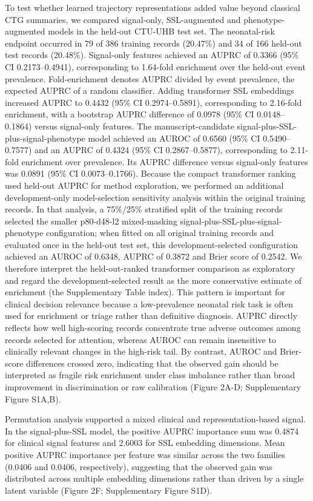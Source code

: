 \documentclass[11pt]{article}
\begin{document}
To test whether learned trajectory representations added value beyond classical CTG summaries, we compared signal-only, SSL-augmented and phenotype-augmented models in the held-out CTU-UHB test set. The neonatal-risk endpoint occurred in 79 of 386 training records (20.47\%) and 34 of 166 held-out test records (20.48\%). Signal-only features achieved an AUPRC of 0.3366 (95\% CI 0.2173--0.4941), corresponding to 1.64-fold enrichment over the held-out event prevalence. Fold-enrichment denotes AUPRC divided by event prevalence, the expected AUPRC of a random classifier. Adding transformer SSL embeddings increased AUPRC to 0.4432 (95\% CI 0.2974--0.5891), corresponding to 2.16-fold enrichment, with a bootstrap AUPRC difference of 0.0978 (95\% CI 0.0148--0.1864) versus signal-only features. The manuscript-candidate signal-plus-SSL-plus-signal-phenotype model achieved an AUROC of 0.6560 (95\% CI 0.5490--0.7577) and an AUPRC of 0.4324 (95\% CI 0.2867--0.5877), corresponding to 2.11-fold enrichment over prevalence. Its AUPRC difference versus signal-only features was 0.0891 (95\% CI 0.0073--0.1766). Because the compact transformer ranking used held-out AUPRC for method exploration, we performed an additional development-only model-selection sensitivity analysis within the original training records. In that analysis, a 75\%/25\% stratified split of the training records selected the smaller p80-d48-l2 mixed-masking signal-plus-SSL-plus-signal-phenotype configuration; when fitted on all original training records and evaluated once in the held-out test set, this development-selected configuration achieved an AUROC of 0.6348, AUPRC of 0.3872 and Brier score of 0.2542. We therefore interpret the held-out-ranked transformer comparison as exploratory and regard the development-selected result as the more conservative estimate of enrichment (the Supplementary Table index). This pattern is important for clinical decision relevance because a low-prevalence neonatal risk task is often used for enrichment or triage rather than definitive diagnosis. AUPRC directly reflects how well high-scoring records concentrate true adverse outcomes among records selected for attention, whereas AUROC can remain insensitive to clinically relevant changes in the high-risk tail. By contrast, AUROC and Brier-score differences crossed zero, indicating that the observed gain should be interpreted as fragile risk enrichment under class imbalance rather than broad improvement in discrimination or raw calibration (Figure 2A-D; Supplementary Figure S1A,B).

Permutation analysis supported a mixed clinical and representation-based signal. In the signal-plus-SSL model, the positive AUPRC importance sum was 0.4874 for clinical signal features and 2.6003 for SSL embedding dimensions. Mean positive AUPRC importance per feature was similar across the two families (0.0406 and 0.0406, respectively), suggesting that the observed gain was distributed across multiple embedding dimensions rather than driven by a single latent variable (Figure 2F; Supplementary Figure S1D).
\end{document}
